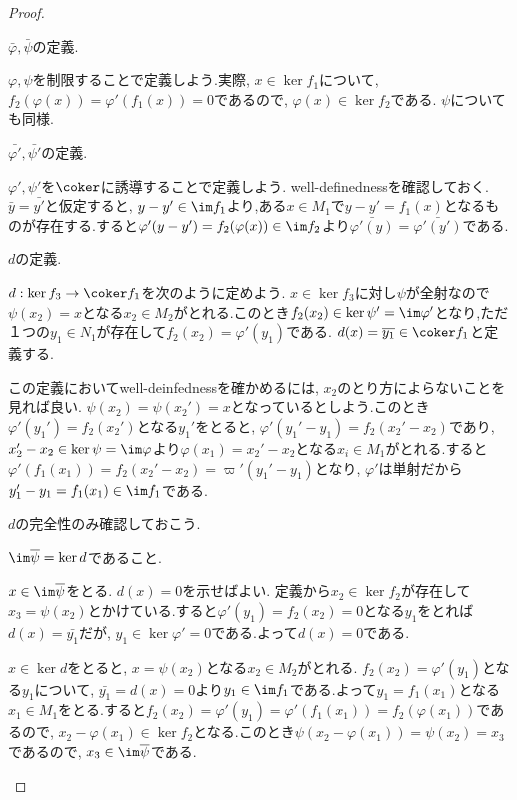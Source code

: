 \begin{proof}
	\begin{step}
		\item $\bar{\varphi},\bar{\psi}$の定義.
		
			$\varphi,\psi$を制限することで定義しよう.実際, $x\in\ker f_1$について, $f_2(\varphi(x))=\varphi'(f_1(x))=0$であるので, $\varphi(x)\in\ker f_2$である. $\psi$についても同様.
			
		\item $\bar{\varphi'},\bar{\psi'}$の定義.
		
			$\varphi',\psi'$を$\coker $に誘導することで定義しよう. well-definednessを確認しておく. $\bar{y}=\bar{y'}$と仮定すると, $y-y'\in\im f_1$より,ある$x\in M_1$で$y-y'=f_1(x)$となるものが存在する.すると$\varphi'(y-y')=f_2(\varphi(x))\in\im f_2$より$\bar{\varphi'(y)}=\bar{\varphi'(y')}$である.
			
		\item $d$の定義.
		
			$d:\ker f_3\to\coker f_1$を次のように定めよう. $x\in\ker f_3$に対し$\psi$が全射なので$\psi(x_2)=x$となる$x_2\in M_2$がとれる.このとき$f_2(x_2)\in\ker\psi'=\im\varphi'$となり,ただ１つの$y_1\in N_1$が存在して$f_2(x_2)=\varphi'(y_1)$である. $d(x)=\bar{y_1}\in\coker f_1$と定義する.
			
			この定義においてwell-deinfednessを確かめるには, $x_2$のとり方によらないことを見れば良い. $\psi(x_2)=\psi(x_2')=x$となっているとしよう.このとき$\varphi'(y_1')=f_2(x_2')$となる$y_1'$をとると, $\varphi'(y_1'-y_1)=f_2(x_2'-x_2)$であり, $x_2'-x_2\in\ker\psi=\im\varphi$より$\varphi(x_1)=x_2'-x_2$となる$x_i\in M_1$がとれる.すると$\varphi'(f_1(x_1))=f_2(x_2'-x_2)=\varpi'(y_1'-y_1)$となり, $\varphi'$は単射だから$y_1'-y_1=f_1(x_1)\in\im f_1$である.
			
		\item $d$の完全性のみ確認しておこう.
		
		\begin{sakura}
			\item $\im\bar\psi=\ker d$であること.
			
			$x\in\im\bar\psi$をとる. $d(x)=0$を示せばよい. 定義から$x_2\in\ker f_2$が存在して$x_3=\psi(x_2)$とかけている.すると$\varphi'(y_1)=f_2(x_2)=0$となる$y_1$をとれば$d(x)=\bar{y_1}$だが, $y_1\in\ker\varphi'=0$である.よって$d(x)=0$である.
			
			$x\in\ker d$をとると, $x=\psi(x_2)$となる$x_2\in M_2$がとれる. $f_2(x_2)=\varphi'(y_1)$となる$y_1$について, $\bar{y_1}=d(x)=0$より$y_1\in\im f_1$である.よって$y_1=f_1(x_1)$となる$x_1\in M_1$をとる.すると$f_2(x_2)=\varphi'(y_1)=\varphi'(f_1(x_1))=f_2(\varphi(x_1))$であるので, $x_2-\varphi(x_1)\in\ker f_2$となる.このとき$\psi(x_2-\varphi(x_1))=\psi(x_2)=x_3$であるので, $x_3\in\im\bar\psi$である.
		

\end{sakura}
\end{step}
\end{proof}
